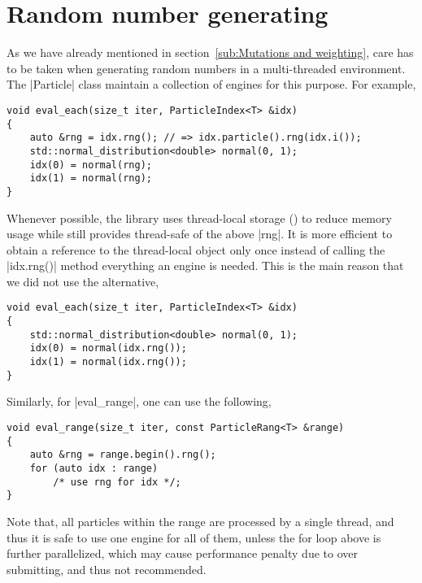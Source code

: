 \section{Random number generating}
\label{sec:Random number generating}

As we have already mentioned in section~\ref{sub:Mutations and weighting}, care
has to be taken when generating random numbers in a multi-threaded environment.
The |Particle| class maintain a collection of \rng engines for this purpose.
For example,
\begin{verbatim}
void eval_each(size_t iter, ParticleIndex<T> &idx)
{
    auto &rng = idx.rng(); // => idx.particle().rng(idx.i());
    std::normal_distribution<double> normal(0, 1);
    idx(0) = normal(rng);
    idx(1) = normal(rng);
}
\end{verbatim}
Whenever possible, the library uses thread-local storage (\tls) to reduce
memory usage while still provides thread-safe of the above |rng|. It is more
efficient to obtain a reference to the thread-local object only once instead of
calling the |idx.rng()| method everything an \rng engine is needed. This is the
main reason that we did not use the alternative,
\begin{verbatim}
void eval_each(size_t iter, ParticleIndex<T> &idx)
{
    std::normal_distribution<double> normal(0, 1);
    idx(0) = normal(idx.rng());
    idx(1) = normal(idx.rng());
}
\end{verbatim}
Similarly, for |eval_range|, one can use the following,
\begin{verbatim}
void eval_range(size_t iter, const ParticleRang<T> &range)
{
    auto &rng = range.begin().rng();
    for (auto idx : range)
        /* use rng for idx */;
}
\end{verbatim}
Note that, all particles within the range are processed by a single thread, and
thus it is safe to use one \rng engine for all of them, unless the for loop
above is further parallelized, which may cause performance penalty due to over
submitting, and thus not recommended.
